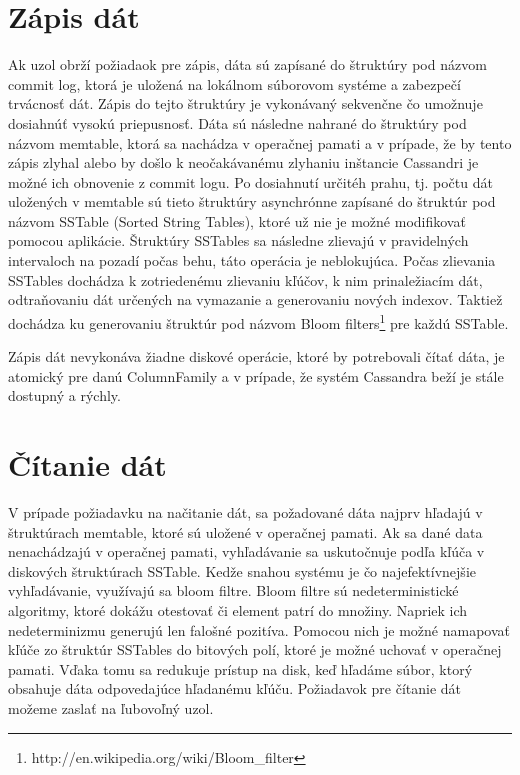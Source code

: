\documentclass[11pt,twoside,a4paper]{book}
\begin{document}
\section{Zápis dát}
Ak uzol obrží požiadaok pre zápis, dáta sú zapísané do štruktúry pod názvom commit log, ktorá je uložená na lokálnom súborovom systéme a zabezpečí trvácnosť dát. Zápis do tejto štruktúry je vykonávaný sekvenčne čo umožnuje dosiahnúť vysokú priepusnosť. Dáta sú následne nahrané do štruktúry pod názvom memtable, ktorá sa nachádza v operačnej pamati a v prípade, že by tento zápis zlyhal alebo by došlo k neočakávanému zlyhaniu inštancie Cassandri je možné ich obnovenie z commit logu. Po dosiahnutí určitéh prahu, tj. počtu dát uložených v memtable sú tieto štruktúry asynchrónne zapísané do štruktúr pod názvom SSTable (Sorted String Tables), ktoré už nie je možné modifikovať pomocou aplikácie. Štruktúry SSTables sa následne zlievajú v pravidelných intervaloch na pozadí počas behu, táto operácia je neblokujúca. Počas zlievania SSTables dochádza k zotriedenému zlievaniu kľúčov, k nim prinaležiacím dát, odtraňovaniu dát určených na vymazanie a generovaniu nových indexov. Taktiež dochádza ku generovaniu štruktúr pod názvom Bloom filters\footnote{http://en.wikipedia.org/wiki/Bloom\_filter} pre každú SSTable.

Zápis dát nevykonáva žiadne diskové operácie, ktoré by potrebovali čítať dáta, je atomický pre danú ColumnFamily a v prípade, že systém Cassandra beží je stále dostupný a rýchly.


\section{Čítanie dát}
V prípade požiadavku na načitanie dát, sa požadované dáta najprv hľadajú v štruktúrach memtable, ktoré sú uložené v operačnej pamati. Ak sa dané data nenachádzajú v operačnej pamati, vyhľadávanie sa uskutočnuje podľa kľúča v diskových štruktúrach SSTable. Kedže snahou systému je čo najefektívnejšie vyhľadávanie, využívajú sa bloom filtre. Bloom filtre sú nedeterministické algoritmy, ktoré dokážu otestovať či element patrí do množiny. Napriek ich nedeterminizmu generujú len falošné pozitíva. Pomocou nich je možné namapovať kľúče zo štruktúr SSTables do bitových polí, ktoré je možné uchovať v operačnej pamati. Vďaka tomu sa redukuje prístup na disk, keď hľadáme súbor, ktorý obsahuje dáta odpovedajúce hľadanému kľúču. Požiadavok pre čítanie dát možeme zaslať na ľubovoľný uzol.
\end{document}
